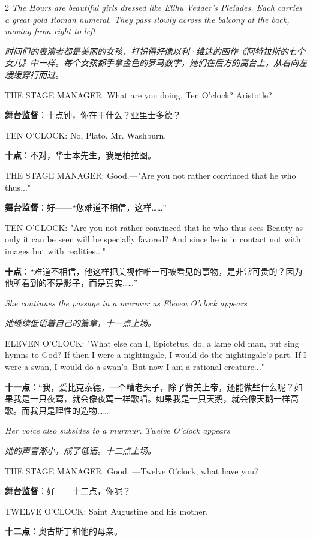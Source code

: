 \documentclass[lang=cn,newtx,10pt,scheme=chinese]{elegantbook}
\newcommand{\pair}[2]{%
\switchcolumn* #2\par
\switchcolumn  #1\par
}
\begin{document}
\begin{paracol}{2}
\pair{
    \textit{时间们的表演者都是美丽的女孩，打扮得好像以利·维达的画作《阿特拉斯的七个女儿》中一样。每个女孩都手拿金色的罗马数字，她们在后方的高台上，从右向左缓缓穿行而过。}
}{
    \textit{The Hours are beautiful girls dressed like Elihu Vedder's Pleiades. Each carries a great gold Roman numeral. They pass slowly across the balcony at the back, moving from right to left.}
    \newline
}

\pair{
    \textbf{舞台监督}：十点钟，你在干什么？亚里士多德？
}{
    THE STAGE MANAGER: What are you doing, Ten O'clock? Aristotle?
}

\pair{
    \textbf{十点}：不对，华士本先生，我是柏拉图。
}{
    TEN O'CLOCK: No, Plato, Mr. Washburn.
}

\pair{
    \textbf{舞台监督}：好——“您难道不相信，这样……”
}{
    THE STAGE MANAGER: Good.—"Are you not rather convinced that he who thus..."
}

\pair{
    \textbf{十点}：“难道不相信，他这样把美视作唯一可被看见的事物，是非常可贵的？因为他所看到的不是影子，而是真实……”
}{
    TEN O'CLOCK: "Are you not rather convinced that he who thus sees Beauty as only it can be seen will be specially favored? And since he is in contact not with images but with realities..."
    \newline
}

\pair{
    \textit{她继续低语着自己的篇章，十一点上场。}
}{
    \textit{She continues the passage in a murmur as Eleven O'clock appears}
    \newline
}

\pair{
    \textbf{十一点}：“我，爱比克泰德，一个糟老头子，除了赞美上帝，还能做些什么呢？如果我是一只夜莺，就会像夜莺一样歌唱。如果我是一只天鹅，就会像天鹅一样高歌。而我只是理性的造物……
}{
    ELEVEN O'CLOCK: "What else can I, Epictetus, do, a lame old man, but sing hymns to God? If then I were a nightingale, I would do the nightingale's part. If I were a swan, I would do a swan's. But now I am a rational creature..."
    \newline
}

\pair{
    \textit{她的声音渐小，成了低语。十二点上场。}
}{
    \textit{Her voice also subsides to a murmur. Twelve O'clock appears}
    \newline
}

\pair{
    \textbf{舞台监督}：好——十二点，你呢？
}{
    THE STAGE MANAGER: Good. —Twelve O'clock, what have you?
}

\pair{
    \textbf{十二点}：奥古斯丁和他的母亲。
}{
    TWELVE O'CLOCK: Saint Augustine and his mother.
}


\end{paracol}
\end{document}

